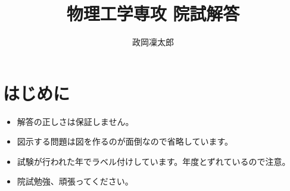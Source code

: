 \documentclass[12pt,titlepage]{ltjsarticle}
\numberwithin{equation}{section}
\begin{document}
\title{物理工学専攻 院試解答}
\author{政岡凜太郎}
\maketitle

\section*{
    はじめに
}
\begin{itemize}
    \item 解答の正しさは保証しません。
    \item 図示する問題は図を作るのが面倒なので省略しています。
    \item 試験が行われた年でラベル付けしています。年度とずれているので注意。
    \item 院試勉強、頑張ってください。
\end{itemize}


\tableofcontents












\end{document}
